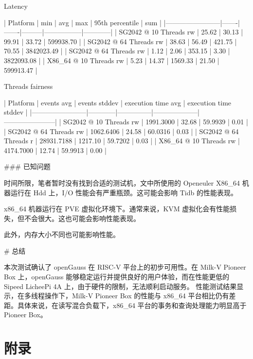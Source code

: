 \documentclass{article}
\begin{document}
\begin{markdown}
Latency

| Platform               | min   | avg   | max     | 95th percentile | sum        |
|------------------------|-------|-------|---------|-----------------|------------|
| SG2042 @ 10 Threads rw | 25.62 | 30.13 | 99.91   | 33.72           | 599938.70  |
| SG2042 @ 64 Threads rw | 38.63 | 56.49 | 421.75  | 70.55           | 3842023.49 |
| SG2042 @ 64 Threads rw | 1.12  | 2.06  | 353.15  | 3.30            | 3822093.08 |
| X86_64 @ 10 Threads rw | 5.23  | 14.37 | 1569.33 | 21.50           | 599913.47  |


Threads fairness

| Platform               | events avg | events stddev | execution time avg | execution time stddev |
|------------------------|------------|---------------|--------------------|-----------------------|
| SG2042 @ 10 Threads rw | 1991.3000  | 32.68         | 59.9939            | 0.01                  |
| SG2042 @ 64 Threads rw | 1062.6406  | 24.58         | 60.0316            | 0.03                  |
| SG2042 @ 64 Threads r  | 28931.7188 | 1217.10       | 59.7202            | 0.03                  |
| X86_64 @ 10 Threads rw | 4174.7000  | 12.74         | 59.9913            | 0.00                  |

### 已知问题

时间所限，笔者暂时没有找到合适的测试机，文中所使用的 Openeuler X86_64 机器运行在 Hdd 上，I/O 性能会有严重瓶颈。这可能会影响 Tidb 的性能表现。

x86_64 机器运行在 PVE 虚拟化环境下。通常来说，KVM 虚拟化会有性能损失，但不会很大。这也可能会影响性能表现。

此外，内存大小不同也可能影响性能。

# 总结

本次测试确认了 openGauss 在 RISC-V 平台上的初步可用性。在 Milk-V Pioneer Box 上，openGauss 能够稳定运行并提供良好的用户体验，而在性能更低的 Sipeed LicheePi 4A 上，由于硬件的限制，无法顺利启动服务。
性能测试结果显示，在多线程操作下，Milk-V Pioneer Box 的性能与 x86_64 平台相比仍有差距。具体来说，在读写混合负载下，x86_64 平台的事务和查询处理能力明显高于 Pioneer Box。

\end{markdown}

\newpage
\appendix

\section{附录}

\end{document}
